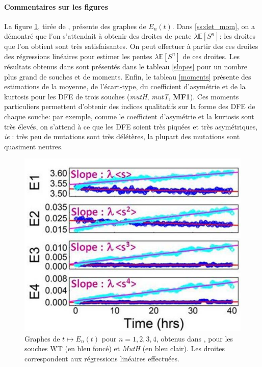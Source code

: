 \documentclass[12pt]{article}
\newcommand{\cro}[1]{\left[#1\right]}
\newcommand{\ie}{\emph{ie} }
\newcommand{\Esp}[1]{\mathbb{E}\cro{#1}}
\begin{document}
\paragraph{Commentaires sur les figures} La figure \ref{lines}, tirée de \cite{rob}, présente des graphes de $E_n(t)$. Dans \ref{ss:det_mom}, on a démontré que l'on s'attendait à obtenir des droites de pente $\lambda\Esp{S^n}$: les droites que l'on obtient sont très satisfaisantes. On peut effectuer à partir des ces droites des régressions linéaires pour estimer  les pentes $\lambda\Esp{S^n}$ de ces droites. Les résultats obtenus dans \cite{rob} sont présentés dans le tableau \ref{slopes} pour un nombre plus grand de souches et de moments. Enfin, le tableau \ref{moments} présente des estimations de la moyenne, de l'écart-type, du coefficient d'asymétrie et de la kurtosis pour les DFE de trois souches (\emph{mutH}, \emph{mutT}, \textbf{MF1}). Ces moments particuliers permettent d'obtenir des indices qualitatifs sur la forme des DFE de chaque souche: par exemple, comme le coefficient d'asymétrie et la kurtosis sont très élevés, on s'attend à ce que les DFE soient très piquées et très asymétriques, \ie: très peu de mutations sont très délétères, la plupart des mutations sont quasiment neutres.


\begin{figure}[h]
  \begin{center}
    \includegraphics[scale=0.3]{img/supmat_lines.png}
  \end{center}
  \caption{\label{lines}Graphes de $t\mapsto E_n(t)$ pour $n=1,2,3,4$, obtenus dans \cite{rob}, pour les souches WT (en bleu foncé) et \emph{MutH} (en bleu clair). Les droites correspondent aux régressions linéaires effectuées.}
\end{figure}
\end{document}
